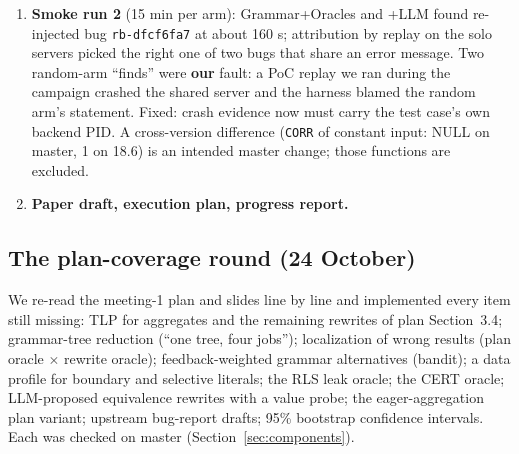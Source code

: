 \begin{enumerate}
    plain query), and \texttt{DISTINCT} over \texttt{numeric} may keep
    \texttt{21.0000} or \texttt{21.00} depending on the plan. Both fixed with
    tests. Also: all four workers shared one reference server and raced on
    schema setup; fixed with one database per worker.
  \item \textbf{Smoke run 2} (15 min per arm): Grammar+Oracles and +LLM found
    re-injected bug \texttt{rb-dfcf6fa7} at about 160 s; attribution by replay
    on the solo servers picked the right one of two bugs that share an error
    message. Two random-arm ``finds'' were \textbf{our} fault: a PoC replay we
    ran during the campaign crashed the shared server and the harness blamed
    the random arm's statement. Fixed: crash evidence now must carry the test
    case's own backend PID. A cross-version difference (\texttt{CORR} of
    constant input: NULL on master, 1 on 18.6) is an intended master change;
    those functions are excluded.
  \item \textbf{Paper draft, execution plan, progress report.}
\end{enumerate}

\subsection{The plan-coverage round (24 October)}

We re-read the meeting-1 plan and slides line by line and implemented every
item still missing: TLP for aggregates and the remaining rewrites of plan
Section~3.4; grammar-tree reduction (``one tree, four jobs''); localization of
wrong results (plan oracle $\times$ rewrite oracle); feedback-weighted grammar
alternatives (bandit); a data profile for boundary and selective literals;
the RLS leak oracle; the CERT oracle; LLM-proposed equivalence rewrites with a
value probe; the eager-aggregation plan variant; upstream bug-report drafts;
95\% bootstrap confidence intervals. Each was checked on master
(Section~\ref{sec:components}).

